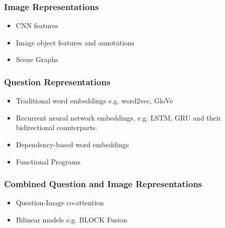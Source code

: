 \subsubsection*{Image Representations}

\begin{itemize}
    \item CNN features
    \item Image object features and annotations
    \item Scene Graphs
\end{itemize}

\subsubsection*{Question Representations}

\begin{itemize}
    \item Traditional word embeddings e.g. word2vec, GloVe
    \item Recurrent neural network embeddings, e.g. LSTM, GRU and their bidirectional counterparts. 
    \item Dependency-based word embeddings \cite{levy2014dependency}
    \item Functional Programs
\end{itemize}

\subsubsection*{Combined Question and Image Representations}

\begin{itemize}
    \item Question-Image co-attention \cite{lu2016hierarchical}
    \item Bilinear models e.g. BLOCK Fusion \cite{ben2019block}
\end{itemize}







